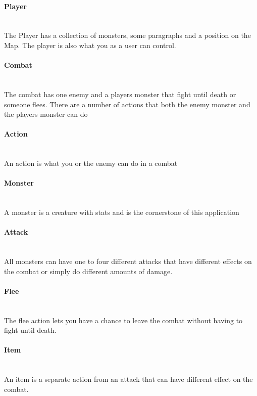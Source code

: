    \paragraph{Player}
    ~\\\indent\indent The Player has a collection of monsters, some paragraph{}s and a position on the Map. The player is also what you as a user can control.
    \paragraph{Combat}
    ~\\\indent\indent The combat has one enemy and a players monster that fight until death or someone flees. There are a number of actions that both the enemy monster and the players monster can do
    \paragraph{Action}
    ~\\\indent\indent An action is what you or the enemy can do in a combat
    \paragraph{Monster}
    ~\\\indent\indent A monster is a creature with stats and is the cornerstone of this application
    \paragraph{Attack}
    ~\\\indent\indent All monsters can have one to four different attacks that have different effects on the combat or simply do different amounts of damage.
    \paragraph{Flee}
    ~\\\indent\indent The flee action lets you have a chance to leave the combat without having to fight until death.
    \paragraph{Item} %
    ~\\\indent\indent An item is a separate action from an attack that can have different effect on the combat.
